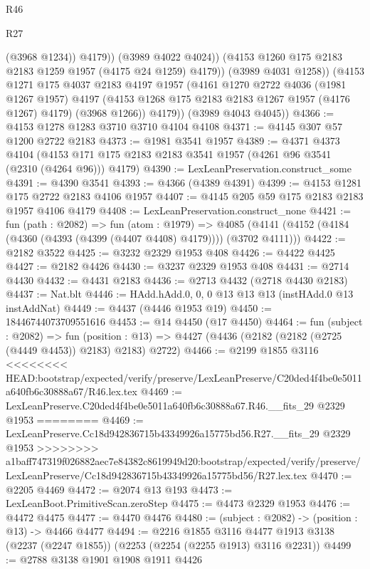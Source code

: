 \begin{lexlean}{R46}
\begin{lexlean}{R27}
\begin{coremodule}
{{{{{{{{{{{{{{{{{{{{{{{{{{{{{{{{{{{{{{{{{{{{{{{{{{{{{{{{{{{{{{                    (@3968 @1234))
                  @4179))
              (@3989 @4022 @4024))
            (@4153 @1260 @175 @2183 @2183 @1259 @1957 (@4175 @24 @1259) @4179))
          (@3989 @4031 @1258))
        (@4153
          @1271
          @175
          @4037
          @2183
          @4197
          @1957
          (@4161
            @1270
            @2722
            @4036
            (@1981 @1267 @1957)
            @4197
            (@4153 @1268 @175 @2183 @2183 @1267 @1957 (@4176 @1267) @4179)
            (@3968 @1266))
          @4179))
      (@3989 @4043 @4045))
@4366 := @4153 @1278 @1283 @3710 @3710 @4104 @4108
@4371 := @4145 @307 @57 @1200 @2722 @2183
@4373 := @1981 @3541 @1957
@4389 := @4371
    @4373
    @4104
    (@4153 @171 @175 @2183 @2183 @3541 @1957 (@4261 @96 @3541 (@2310 (@4264 @96))) @4179)
@4390 := LexLeanPreservation.construct_some
@4391 := @4390 @3541
@4393 := @4366 (@4389 @4391)
@4399 := @4153 @1281 @175 @2722 @2183 @4106 @1957
@4407 := @4145 @205 @59 @175 @2183 @2183 @1957 @4106 @4179
@4408 := LexLeanPreservation.construct_none
@4421 := fun (path : @2082) =>
  fun (atom : @1979) =>
  @4085 (@4141 (@4152 (@4184 (@4360 (@4393 (@4399 (@4407 @4408) @4179)))) (@3702 @4111)))
@4422 := @2182 @3522
@4425 := @3232 @2329 @1953 @408
@4426 := @4422 @4425
@4427 := @2182 @4426
@4430 := @3237 @2329 @1953 @408
@4431 := @2714 @4430
@4432 := @4431 @2183
@4436 := @2713 @4432 (@2718 @4430 @2183)
@4437 := Nat.blt
@4446 := HAdd.hAdd.{0, 0, 0} @13 @13 @13 (instHAdd.{0} @13 instAddNat)
@4449 := @4437 (@4446 @1953 @19)
@4450 := 18446744073709551616
@4453 := @14 @4450 (@17 @4450)
@4464 := fun (subject : @2082) =>
  fun (position : @13) => @4427 (@4436 (@2182 (@2182 (@2725 (@4449 @4453)) @2183) @2183) @2722)
@4466 := @2199 @1855 @3116
<<<<<<<< HEAD:bootstrap/expected/verify/preserve/LexLeanPreserve/C20ded4f4be0e5011a640fb6c30888a67/R46.lex.tex
@4469 := LexLeanPreserve.C20ded4f4be0e5011a640fb6c30888a67.R46.__fits_29 @2329 @1953
========
@4469 := LexLeanPreserve.Cc18d942836715b43349926a15775bd56.R27.__fits_29 @2329 @1953
>>>>>>>> a1baff747319f026882aec7e84382c8619949d20:bootstrap/expected/verify/preserve/LexLeanPreserve/Cc18d942836715b43349926a15775bd56/R27.lex.tex
@4470 := @2205 @4469
@4472 := @2074 @13 @193
@4473 := LexLeanBoot.PrimitiveScan.zeroStep
@4475 := @4473 @2329 @1953
@4476 := @4472 @4475
@4477 := @4470 @4476
@4480 := (subject : @2082) -> (position : @13) -> @4466 @4477
@4494 := @2216
    @1855
    @3116
    @4477
    @1913
    @3138
    (@2237 (@2247 @1855))
    (@2253 (@2254 (@2255 @1913) @3116 @2231))
@4499 := @2788 @3138 @1901 @1908 @1911 @4426
}}}}}}}}}}}}}}}}}}}}}}}}}}}}}}}}}}}}}}}}}}}}}}}}}}}}}}}}}}}}}}
\end{coremodule}
\end{lexlean}
\end{lexlean}
